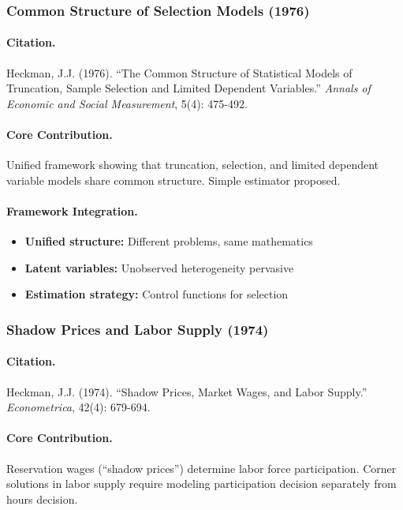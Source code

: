 \subsubsection{Common Structure of Selection Models (1976)}

\paragraph{Citation.}
Heckman, J.J. (1976). ``The Common Structure of Statistical Models of
Truncation, Sample Selection and Limited Dependent Variables.''
\emph{Annals of Economic and Social Measurement}, 5(4): 475-492.

\paragraph{Core Contribution.}
Unified framework showing that truncation, selection, and limited
dependent variable models share common structure. Simple estimator proposed.

\paragraph{Framework Integration.}
\begin{itemize}
  \item \textbf{Unified structure:} Different problems, same mathematics
  \item \textbf{Latent variables:} Unobserved heterogeneity pervasive
  \item \textbf{Estimation strategy:} Control functions for selection
\end{itemize}

\subsubsection{Shadow Prices and Labor Supply (1974)}

\paragraph{Citation.}
Heckman, J.J. (1974). ``Shadow Prices, Market Wages, and Labor Supply.''
\emph{Econometrica}, 42(4): 679-694.

\paragraph{Core Contribution.}
Reservation wages (``shadow prices'') determine labor force participation.
Corner solutions in labor supply require modeling participation decision
separately from hours decision.


